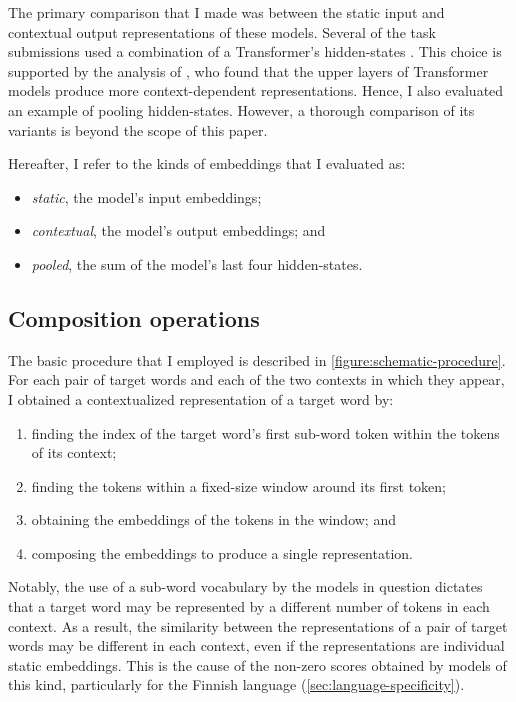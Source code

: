 The primary comparison that I made was between the static input and contextual output
representations of these models.
Several of the task submissions used a combination of a Transformer's hidden-states
\parencites[e.g.][276]{Gamallo2020}[61]{CostellaPessutto2020}[145]{Hettiarachchi2020}.
This choice is supported by the analysis of \textcites{Ethayarajh2019}, who found that
the upper layers of Transformer models produce more context-dependent representations.
Hence, I also evaluated an example of pooling hidden-states.
However, a thorough comparison of its variants is beyond the scope of this paper.
\begin{samepage}
  Hereafter, I refer to the kinds of embeddings that I evaluated as:
  \begin{itemize}
    \item \emph{static}, the model's input embeddings;
    \item \emph{contextual}, the model's output embeddings; and
    \item \emph{pooled}, the sum of the model's last four hidden-states.
  \end{itemize}
\end{samepage}

\subsection{Composition operations}
\label{sec:composition-operations}

The basic procedure that I employed is described in \cref{figure:schematic-procedure}.
For each pair of target words and each of the two contexts in which they appear, I
obtained a contextualized representation of a target word by:
\begin{enumerate}
  \item finding the index of the target word's first sub-word token within the tokens of its context;
  \item finding the tokens within a fixed-size window around its first token;
  \item obtaining the embeddings of the tokens in the window; and
  \item composing the embeddings to produce a single representation.
\end{enumerate}
Notably, the use of a sub-word vocabulary by the models in question
\parencites[e.g.][4174]{Devlin2019} dictates that a target word may be represented by a
different number of tokens in each context.
As a result, the similarity between the representations of a pair of target words may
be different in each context, even if the representations are individual static
embeddings.
This is the cause of the non-zero scores obtained by models of this kind, particularly
for the Finnish language (\cref{sec:language-specificity}).


